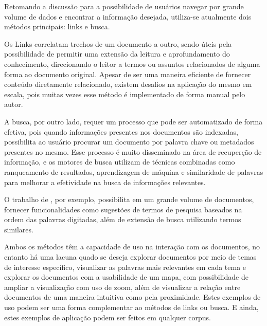 \documentclass[12pt,a4paper]{article}
\begin{document}
 
 Retomando a discussão para a possibilidade de usuários navegar por grande volume de dados e encontrar a informação desejada, utiliza-se atualmente dois métodos principais:
 links e busca. 
 
 Os Links correlatam trechos de um documento a outro, sendo úteis pela possibilidade de permitir uma extensão da leitura e aprofundamento do conhecimento,
 direcionando o leitor a termos ou assuntos relacionados de alguma forma ao documento original. Apesar de ser uma maneira eficiente de fornecer conteúdo diretamente relacionado,
 existem desafios na aplicação do mesmo em escala, pois muitas vezes esse método é implementado de forma manual pelo autor. 
 
 A busca, por outro lado,
 requer um processo que pode ser automatizado de forma efetiva, pois quando informações presentes nos documentos são indexadas, possibilita ao usuário procurar um documento por palavra chave ou metadados presentes no mesmo.
 Esse processo é muito disseminado na área de recuperção de informação, e os motores de busca utilizam de técnicas combinadas como ranqueamento de resultados, aprendizagem de máquina e similaridade de palavras para melhorar a efetividade na busca de informações relevantes.

 O trabalho de , por exemplo, possibilita em um grande volume de documentos, fornecer funcionalidades como sugestões de termos de pesquisa baseados na ordem das palavras digitadas, além de extensão de busca utilizando termos similares.

Ambos os métodos têm a capacidade de uso na interação com os documentos, no entanto há uma lacuna quado se deseja explorar documentos por meio de temas de interesse específico,
 visualizar as palavras mais relevantes em cada tema e explorar os documentos com a usabilidade de um mapa, com possibilidade de ampliar a visualização com uso de zoom, além de visualizar a relação entre documentos de uma maneira intuitiva como pela proximidade. Estes exemplos de uso podem ser uma forma complementar ao métodos de links ou busca. E ainda, estes exemplos de aplicação podem ser feitos em qualquer corpus.
 
\end{document}
